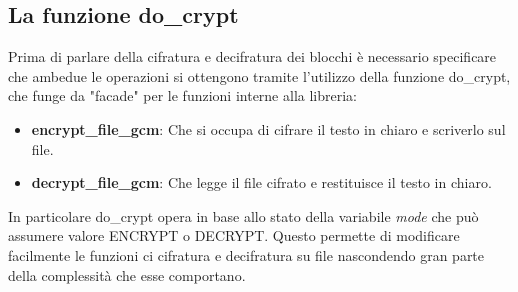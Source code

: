 \subsection{La funzione do\_crypt}
Prima di parlare della cifratura e decifratura dei blocchi è necessario specificare che ambedue le operazioni si ottengono tramite l'utilizzo della funzione do\_crypt, che funge da "facade" per le funzioni interne alla libreria:
\begin{itemize}
    \item \textbf{encrypt\_file\_gcm}: Che si occupa di cifrare il testo in chiaro e scriverlo sul file.
    \item \textbf{decrypt\_file\_gcm}: Che legge il file cifrato e restituisce il testo in chiaro.
\end{itemize}
In particolare do\_crypt opera in base allo stato della variabile \textit{mode} che può assumere valore ENCRYPT o DECRYPT. Questo permette di modificare facilmente le funzioni ci cifratura e decifratura su file nascondendo gran parte della complessità che esse comportano.

